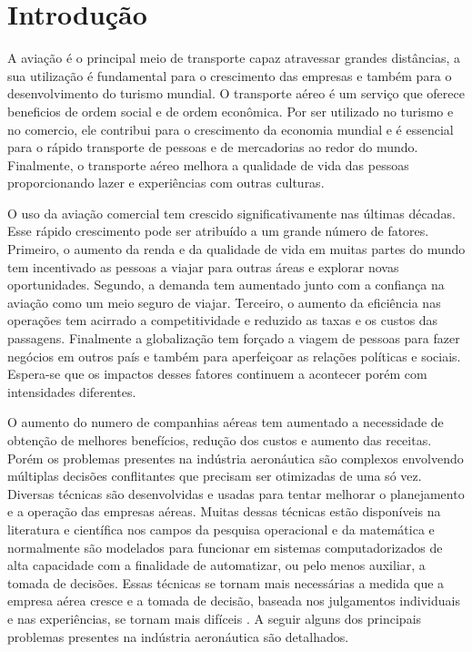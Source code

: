 \chapter{Introdução}
  
  	A aviação é o principal meio de transporte capaz atravessar grandes distâncias, a sua utilização é fundamental para o crescimento das empresas e também para o desenvolvimento do turismo mundial. O transporte aéreo é um serviço que oferece beneficios de ordem social e de ordem econômica. Por ser utilizado no turismo e no comercio, ele contribui para o crescimento da economia mundial e é essencial para o rápido transporte de pessoas e de mercadorias ao redor do mundo. Finalmente, o transporte aéreo melhora a qualidade de vida das pessoas proporcionando lazer e experiências com outras culturas.
  	
  	O uso da aviação comercial tem crescido significativamente nas últimas décadas. Esse rápido crescimento pode ser atribuído a um grande número de fatores. Primeiro, o aumento da renda e da qualidade de vida em muitas partes do mundo tem incentivado as pessoas a viajar para outras áreas e explorar novas oportunidades. Segundo, a demanda tem aumentado junto com a confiança na aviação como um meio seguro de viajar. Terceiro, o aumento da eficiência nas operações tem acirrado a competitividade e reduzido as taxas e os custos das passagens. Finalmente a globalização tem forçado a viagem de pessoas para fazer negócios em outros país e também para aperfeiçoar as relações políticas e sociais. Espera-se que os impactos desses fatores continuem a acontecer porém com intensidades diferentes.
  	
  	O aumento do numero de companhias aéreas tem aumentado a necessidade de obtenção de melhores benefícios, redução dos custos e aumento das receitas. Porém os problemas presentes na indústria aeronáutica são complexos envolvendo múltiplas decisões conflitantes que precisam ser otimizadas de uma só vez. Diversas técnicas são desenvolvidas e usadas para tentar melhorar o planejamento e a operação das empresas aéreas. Muitas dessas técnicas estão disponíveis na literatura e científica nos campos da pesquisa operacional e da matemática e normalmente são modelados para funcionar em sistemas computadorizados de alta capacidade com a finalidade de automatizar, ou pelo menos auxiliar, a tomada de decisões. Essas técnicas se tornam mais necessárias a medida que a empresa aérea cresce e a tomada de decisão, baseada nos julgamentos individuais e nas experiências, se tornam mais difíceis \cite{ahmed2009}. A seguir alguns dos principais problemas presentes na indústria aeronáutica são detalhados.
  	
